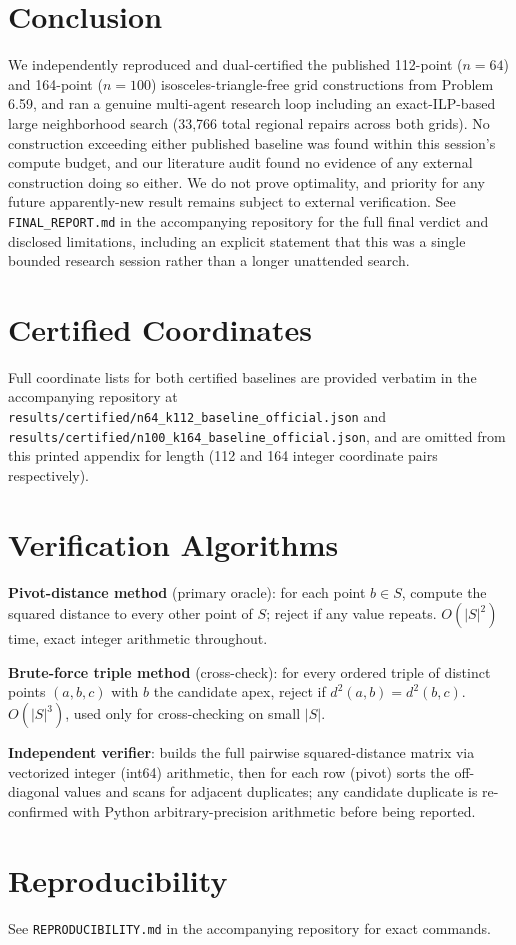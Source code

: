 \documentclass[11pt]{article}
\begin{document}
\section{Conclusion}

We independently reproduced and dual-certified the published 112-point ($n=64$) and
164-point ($n=100$) isosceles-triangle-free grid constructions from Problem 6.59,
and ran a genuine multi-agent research loop including an exact-ILP-based large
neighborhood search (33{,}766 total regional repairs across both grids). No
construction exceeding either published baseline was found within this session's
compute budget, and our literature audit found no evidence of any external
construction doing so either. We do not prove optimality, and priority for any
future apparently-new result remains subject to external verification. See
\texttt{FINAL\_REPORT.md} in the accompanying repository for the full final verdict
and disclosed limitations, including an explicit statement that this was a single
bounded research session rather than a longer unattended search.

\appendix
\section{Certified Coordinates}
Full coordinate lists for both certified baselines are provided verbatim in the
accompanying repository at \texttt{results/certified/n64\_k112\_baseline\_official.json}
and \texttt{results/certified/n100\_k164\_baseline\_official.json}, and are omitted
from this printed appendix for length (112 and 164 integer coordinate pairs
respectively).

\section{Verification Algorithms}
\textbf{Pivot-distance method} (primary oracle): for each point $b \in S$, compute
the squared distance to every other point of $S$; reject if any value repeats.
$O(|S|^2)$ time, exact integer arithmetic throughout.

\textbf{Brute-force triple method} (cross-check): for every ordered triple of
distinct points $(a,b,c)$ with $b$ the candidate apex, reject if
$d^2(a,b) = d^2(b,c)$. $O(|S|^3)$, used only for cross-checking on small $|S|$.

\textbf{Independent verifier}: builds the full pairwise squared-distance matrix via
vectorized integer (int64) arithmetic, then for each row (pivot) sorts the
off-diagonal values and scans for adjacent duplicates; any candidate duplicate is
re-confirmed with Python arbitrary-precision arithmetic before being reported.

\section{Reproducibility}
See \texttt{REPRODUCIBILITY.md} in the accompanying repository for exact commands.



\end{document}
